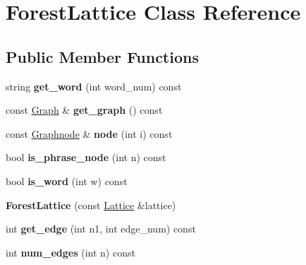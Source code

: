 \hypertarget{classForestLattice}{
\section{ForestLattice Class Reference}
\label{classForestLattice}
}
\subsection*{Public Member Functions}
\begin{DoxyCompactItemize}
\item 
\hypertarget{classForestLattice_ad14bc799ac36b716c292f410e1609462}{
string {\bfseries get\_\-word} (int word\_\-num) const }
\label{classForestLattice_ad14bc799ac36b716c292f410e1609462}

\item 
\hypertarget{classForestLattice_a8303ce943210d4a62132f1e4054b7191}{
const \hyperlink{classScarab_1_1Graph_1_1Graph}{Graph} \& {\bfseries get\_\-graph} () const }
\label{classForestLattice_a8303ce943210d4a62132f1e4054b7191}

\item 
\hypertarget{classForestLattice_a744558d8489b4428c44275f0966d587e}{
const \hyperlink{classScarab_1_1Graph_1_1Graphnode}{Graphnode} \& {\bfseries node} (int i) const }
\label{classForestLattice_a744558d8489b4428c44275f0966d587e}

\item 
\hypertarget{classForestLattice_a8afba92a7fb437a93db30b2336ad3824}{
bool {\bfseries is\_\-phrase\_\-node} (int n) const }
\label{classForestLattice_a8afba92a7fb437a93db30b2336ad3824}

\item 
\hypertarget{classForestLattice_a9d82493dff97186334923b582999f63c}{
bool {\bfseries is\_\-word} (int w) const }
\label{classForestLattice_a9d82493dff97186334923b582999f63c}

\item 
\hypertarget{classForestLattice_a9ecaabd3e59148b28b3fad096806f9e9}{
{\bfseries ForestLattice} (const \hyperlink{classlattice_1_1Lattice}{Lattice} \&lattice)}
\label{classForestLattice_a9ecaabd3e59148b28b3fad096806f9e9}

\item 
\hypertarget{classForestLattice_a981af70e7207ece0e3454251b64fb6fa}{
int {\bfseries get\_\-edge} (int n1, int edge\_\-num) const }
\label{classForestLattice_a981af70e7207ece0e3454251b64fb6fa}

\item 
\hypertarget{classForestLattice_a142184cf6e8d4275923774edbca97f5d}{
int {\bfseries num\_\-edges} (int n) const }
\label{classForestLattice_a142184cf6e8d4275923774edbca97f5d}


\end{DoxyCompactItemize}
